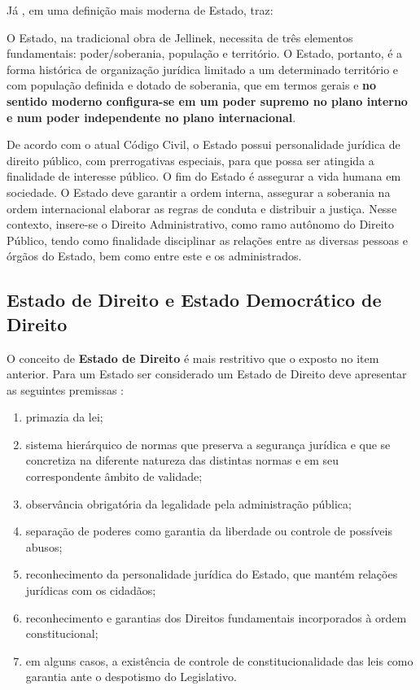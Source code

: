 \documentclass[
	10pt,				%
	openright,			%
	twoside,			%
	a5paper,			%
	english,			%
	french,				%
	spanish,			%
	brazil				%
	]{abntex2}
\renewenvironment{quote}
  {\small\list{}{\rightmargin=0.1cm \leftmargin=4cm}%
   \item\relax}
  {\endlist}
\begin{document}
Já , em uma definição mais
moderna de Estado, traz:

\begin{quote}
O Estado, na tradicional obra de Jellinek, necessita de três elementos
fundamentais: poder/soberania, população e território. O Estado,
portanto, é a forma histórica de organização jurídica limitado a um
determinado território e com população definida e dotado de soberania,
que em termos gerais e \textbf{no sentido moderno configura-se em um
poder supremo no plano interno e num poder independente no plano
internacional}.
\end{quote}

De acordo com o atual Código Civil, o Estado possui personalidade
jurídica de direito público, com prerrogativas especiais, para que possa
ser atingida a finalidade de interesse público. O fim do Estado é
assegurar a vida humana em sociedade. O Estado deve garantir a ordem
interna, assegurar a soberania na ordem internacional elaborar as regras
de conduta e distribuir a justiça. Nesse contexto, insere-se o Direito
Administrativo, como ramo autônomo do Direito Público, tendo como
finalidade disciplinar as relações entre as diversas pessoas e órgãos do
Estado, bem como entre este e os administrados.

\subsection{Estado de Direito e Estado Democrático de
Direito}\label{estado-de-direito-e-estado-democruxe1tico-de-direito}

O conceito de \textbf{Estado de Direito} é mais restritivo que o exposto
no item anterior. Para um Estado ser considerado um Estado de Direito
deve apresentar as seguintes premissas \cite[p.~5]{moraes}:

\begin{enumerate}
\def\labelenumi{\arabic{enumi})}
\tightlist
\item
  primazia da lei;
\item
  sistema hierárquico de normas que preserva a segurança jurídica e que
  se concretiza na diferente natureza das distintas normas e em seu
  correspondente âmbito de validade;
\item
  observância obrigatória da legalidade pela administração pública;
\item
  separação de poderes como garantia da liberdade ou controle de
  possíveis abusos;
\item
  reconhecimento da personalidade jurídica do Estado, que mantém
  relações jurídicas com os cidadãos;
\item
  reconhecimento e garantias dos Direitos fundamentais incorporados à
  ordem constitucional;
\item
  em alguns casos, a existência de controle de constitucionalidade das
  leis como garantia ante o despotismo do Legislativo.
\end{enumerate}
\end{document}
